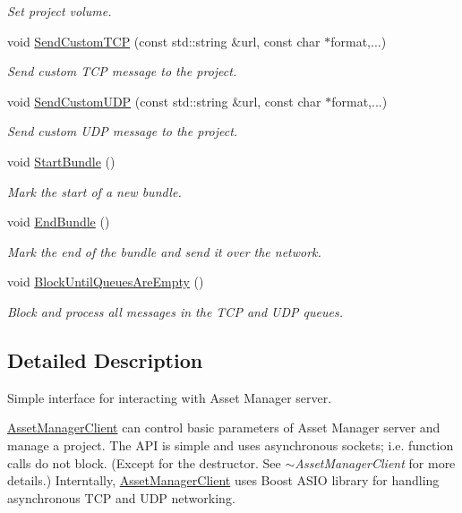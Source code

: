 \begin{DoxyCompactItemize}
\begin{DoxyCompactList}\small\item\em Set project volume. \end{DoxyCompactList}\item 
void \hyperlink{classam_1_1_asset_manager_client_ae926351a13831b539c185e2ec4f7a9d9}{SendCustomTCP} (const std::string \&url, const char $\ast$format,...)
\begin{DoxyCompactList}\small\item\em Send custom TCP message to the project. \end{DoxyCompactList}\item 
void \hyperlink{classam_1_1_asset_manager_client_a547f6a9f9acdf7318c47640099cff091}{SendCustomUDP} (const std::string \&url, const char $\ast$format,...)
\begin{DoxyCompactList}\small\item\em Send custom UDP message to the project. \end{DoxyCompactList}\item 
void \hyperlink{classam_1_1_asset_manager_client_aa3915a3098877eb926859b978309f872}{StartBundle} ()
\begin{DoxyCompactList}\small\item\em Mark the start of a new bundle. \end{DoxyCompactList}\item 
void \hyperlink{classam_1_1_asset_manager_client_a53e3932c674527bb7568c2de594db296}{EndBundle} ()
\begin{DoxyCompactList}\small\item\em Mark the end of the bundle and send it over the network. \end{DoxyCompactList}\item 
void \hyperlink{classam_1_1_asset_manager_client_a9620f60faa62e47edd4c37699a424a39}{BlockUntilQueuesAreEmpty} ()
\begin{DoxyCompactList}\small\item\em Block and process all messages in the TCP and UDP queues. \end{DoxyCompactList}\end{DoxyCompactItemize}


\subsection{Detailed Description}
Simple interface for interacting with Asset Manager server. 

\hyperlink{classam_1_1_asset_manager_client}{AssetManagerClient} can control basic parameters of Asset Manager server and manage a project. The API is simple and uses asynchronous sockets; i.e. function calls do not block. (Except for the destructor. See {\itshape $\sim$AssetManagerClient\/} for more details.) Interntally, \hyperlink{classam_1_1_asset_manager_client}{AssetManagerClient} uses Boost ASIO library for handling asynchronous TCP and UDP networking. 

